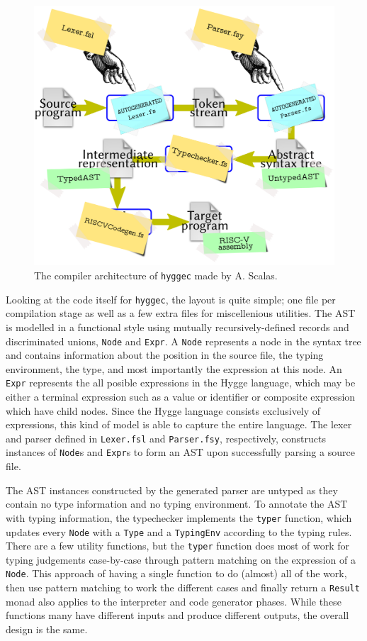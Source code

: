 \begin{figure}[H]
\centering
\includegraphics[width=\textwidth]{Pictures/hyggec_compiler_phases.png}
\caption{The compiler architecture of \texttt{hyggec} made by A. Scalas.}
\label{fig:hyggec_compiler_phases}
\end{figure}

Looking at the code itself for \texttt{hyggec}, the layout is quite simple; one file per compilation stage as well as a few extra
files for miscellenious utilities. The AST is modelled in a functional style using mutually recursively-defined records and discriminated
unions, \texttt{Node} and \texttt{Expr}. A \texttt{Node} represents a node in the syntax tree and contains information about the
position in the source file, the typing environment, the type, and most importantly the expression at this node. An \texttt{Expr}
represents the all posible expressions in the Hygge language, which may be either a terminal expression such as a value or identifier
or composite expression which have child nodes. Since the Hygge language consists exclusively of expressions, this kind of model is
able to capture the entire language. The lexer and parser defined in \texttt{Lexer.fsl} and \texttt{Parser.fsy}, respectively,
constructs instances of \texttt{Node}s and \texttt{Expr}s to form an AST upon successfully parsing a source file.

The AST instances constructed by the generated parser are untyped as they contain no type information and no typing environment.
To annotate the AST with typing information, the typechecker implements the \texttt{typer} function, which updates every \texttt{Node}
with a \texttt{Type} and a \texttt{TypingEnv} according to the typing rules. There are a few utility functions, but the \texttt{typer}
function does most of work for typing judgements case-by-case through pattern matching on the expression of a \texttt{Node}. This
approach of having a single function to do (almost) all of the work, then use pattern matching to work the different cases and
finally return a \texttt{Result} monad also applies to the interpreter and code generator phases. While these functions many have
different inputs and produce different outputs, the overall design is the same.
